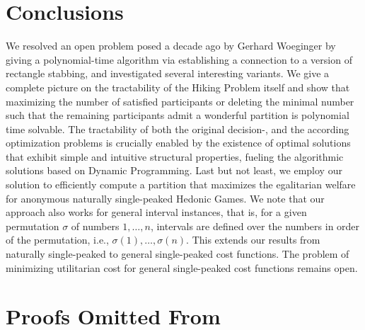 \documentclass[a4paper,UKenglish,cleveref, autoref, thm-restate]{lipics-v2021}
\begin{document}
\section{Conclusions}
We resolved an open problem posed a decade ago by Gerhard Woeginger by giving a polynomial-time algorithm via establishing a connection to a version of rectangle stabbing, and investi\-ga\-ted several interesting variants. We give a complete picture on the tractability of the Hiking Problem itself and show that maximizing the number of satisfied participants or deleting the minimal number such that the remaining participants admit a wonderful partition is polynomial time solvable. The tractability of both the original decision-, and the according optimization problems is crucially enabled by the existence of optimal solutions that exhibit simple and intuitive structural properties, fueling the algorithmic solutions based on Dynamic Programming. Last but not least, we employ our solution to efficiently compute a partition that maximizes
the egalitarian welfare for anonymous naturally single-peaked Hedonic Games. We note that our approach also works for general interval instances, that is, for a given permutation $\sigma$ of numbers $1,\dots,n$, intervals are defined over the numbers in order of the permutation, i.e., $\sigma(1), \dots ,\sigma(n)$. This extends our results from naturally single-peaked to general single-peaked cost functions. The problem of minimizing utilitarian cost for general single-peaked cost functions remains open. 




\appendix

\section{Proofs Omitted From }\label{app:omitted}
\end{document}
